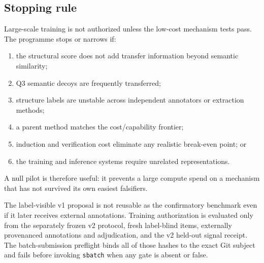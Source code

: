 \subsection{Stopping rule}

Large-scale training is not authorized unless the low-cost mechanism tests pass. The programme stops or narrows if:
\begin{enumerate}[leftmargin=*]
\item the structural score does not add transfer information beyond semantic similarity;
\item Q3 semantic decoys are frequently transferred;
\item structure labels are unstable across independent annotators or extraction methods;
\item a parent method matches the cost/capability frontier;
\item induction and verification cost eliminate any realistic break-even point; or
\item the training and inference systems require unrelated representations.
\end{enumerate}

A null pilot is therefore useful: it prevents a large compute spend on a mechanism that has not survived its own easiest falsifiers.

The label-visible v1 proposal is not reusable as the confirmatory benchmark even
if it later receives external annotations.  Training authorization is evaluated
only from the separately frozen v2 protocol, fresh label-blind items, externally
provenanced annotations and adjudication, and the v2 held-out signal receipt.  The
batch-submission preflight binds all of those hashes to the exact Git subject and
fails before invoking \texttt{sbatch} when any gate is absent or false.
